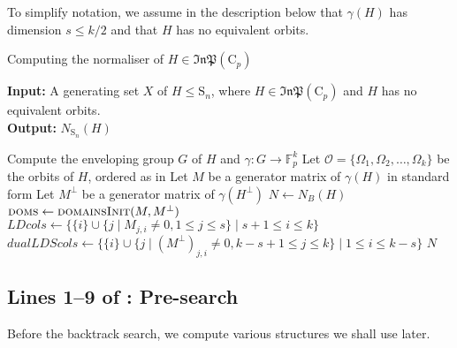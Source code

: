 \documentclass[11pt,a4paper]{article}
\theoremstyle{definition}
\theoremstyle{remark}
\newcommand{\InP}{\mathfrak{InP}}
\newcommand{\Sy}{\mathrm{S}}
\newcommand{\Cy}{\mathrm{C}}
\begin{document}
To simplify notation, we assume in the description below that $\gamma(H)$ has dimension $s \leq k/2$ and that $H$ has no equivalent orbits. 

\begin{algorithm}
\caption{Computing the normaliser of $H \in \InP(\Cy_p)$}
\label{algm: main norm algorithm}
\textbf{Input:} A generating set $X$ of $H \leq \Sy_n$, where $H \in \InP(\Cy_p)$ and $H$ has no equivalent orbits. \\
\textbf{Output:} $N_{\Sy_n}(H)$  
\begin{algorithmic}[1]
\IIf {$H \not \in \InP(\Cy_p)$}  \EndIIf {}
\State Compute the enveloping group $G$ of $H$ and $\gamma:G \rightarrow \mathds{F}_p^k$ 
\State Let $\mathcal{O} = \{ \Omega_1, \Omega_2, \ldots, \Omega_k \}$ be the orbits of $H$, ordered as in  
\State Let $M$ be a generator matrix of $\gamma(H)$ in standard form
\State Let $M^{\bot}$ be a generator matrix of $\gamma(H^{\bot})$ 
\State $N \gets N_B(H)$ 
\State $\textsc{doms} \gets \textsc{domainsInit}(M, M^{\bot})$ 
\State $LDcols \gets \{ \{i\} \cup \{j \mid M_{j,i} \neq 0,  1 \leq j \leq s \}  \mid s+1 \leq i \leq k \}$ 
\State ${dualLDScols} \gets \{ \{i\} \cup \{j \mid  (M^{\bot})_{j,i}  \neq 0,  k-s+1 \leq j \leq k  \}  \mid 1 \leq  i \leq k-s \}$ 
 
\State \Return $N$
\end{algorithmic}
\end{algorithm}




\subsection*{Lines 1--9 of : Pre-search}
\label{subsection: pre-search}

Before the backtrack search, we compute various structures we shall use later. 
\end{document}
